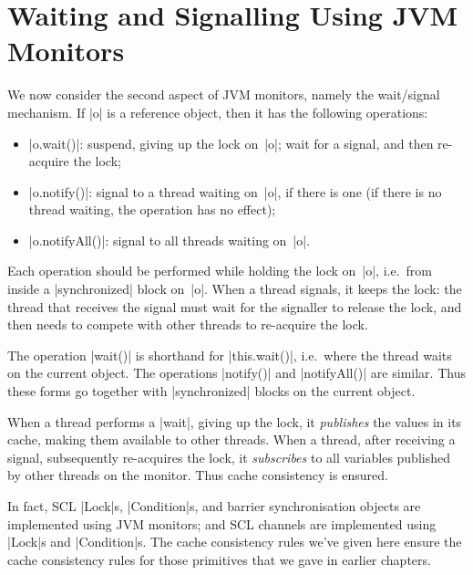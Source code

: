 \section{Waiting and Signalling Using JVM Monitors}

We now consider the second aspect of JVM monitors, namely the wait/signal
mechanism.  If |o| is a reference object, then it has the following
operations:
%
\begin{itemize}
\item |o.wait()|: suspend, giving up
  the lock on~|o|; wait for a signal, and then re-acquire the lock;

\item |o.notify()|: signal to a
  thread waiting on~|o|, if there is one (if there is no thread waiting, the
  operation has no effect);

\item |o.notifyAll()|:
  signal to all threads waiting on~|o|.
\end{itemize}
%
Each operation should be performed while holding the lock on~|o|, i.e.~from
inside a |synchronized| block on~|o|.  When a thread signals, it keeps the
lock: the thread that receives the signal must wait for the signaller to
release the lock, and then needs to compete with other threads to re-acquire
the lock.  

The operation |wait()| is shorthand for |this.wait()|, i.e.~where the thread
waits on the current object.  The operations |notify()| and |notifyAll()| are
similar.  Thus these forms go together with |synchronized| blocks on the
current object.

When a thread performs a |wait|, giving up the lock, it
\emph{publishes} the values in its cache, making them available
to other threads.  When a thread, after receiving a signal, subsequently
re-acquires the lock, it \emph{subscribes} to all variables
published by other threads on the monitor.  Thus cache consistency is ensured.

In fact, SCL |Lock|s, |Condition|s, and barrier synchronisation objects are
implemented using JVM monitors; and SCL channels are implemented using |Lock|s
and |Condition|s.  The cache consistency rules we've given here ensure the
cache consistency rules for those primitives that we gave in earlier
chapters. 

